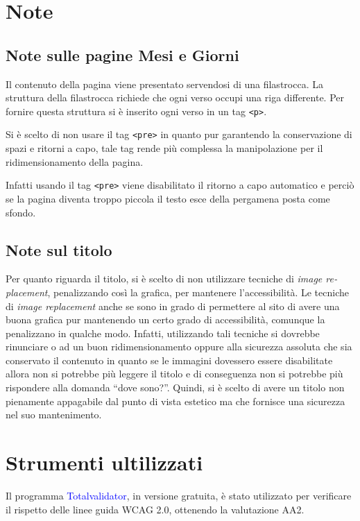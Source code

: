 \documentclass[10pt,a4paper,onecolumn]{article}
\newcommand{\inglese}[1]{\foreignlanguage{english}{\itshape{}#1}}
\newcommand{\progname}[1]{\textcolor{blue}{\textsf{#1}}}
\begin{document}
\section{Note}
\subsection{Note sulle pagine Mesi e Giorni}
Il contenuto della pagina viene presentato servendosi di una filastrocca. La struttura della filastrocca richiede che ogni verso occupi una riga differente. Per fornire questa struttura si è inserito ogni verso in un tag \texttt{<p>}.

Si è scelto di non usare il tag \texttt{<pre>} in quanto pur garantendo la conservazione di spazi e ritorni a capo, tale tag rende più complessa la manipolazione per il ridimensionamento della pagina.

Infatti usando il tag \texttt{<pre>} viene disabilitato il ritorno a capo automatico e perciò se la pagina diventa troppo piccola il testo esce della pergamena posta come sfondo.

\subsection{Note sul titolo}

Per quanto riguarda il titolo, si è scelto di non utilizzare tecniche di \inglese{image replacement}, penalizzando così la grafica, per mantenere l'accessibilità. Le tecniche di \inglese{image replacement} anche se sono in grado di permettere al sito di avere una buona grafica pur mantenendo un certo grado di accessibilità, comunque la penalizzano in qualche modo. Infatti, utilizzando tali tecniche si dovrebbe rinunciare o ad un buon ridimensionamento oppure alla sicurezza assoluta che sia conservato il contenuto in quanto se le immagini dovessero essere disabilitate allora non si potrebbe più leggere il titolo e di conseguenza non si potrebbe più rispondere alla domanda ``dove sono?''. Quindi, si è scelto di avere un titolo non pienamente appagabile dal punto di vista estetico ma che fornisce una sicurezza nel suo mantenimento.

\section{Strumenti ultilizzati}\label{sec:strumenti}

Il programma \progname{Totalvalidator}, in versione gratuita, è stato utilizzato per verificare il rispetto delle linee guida WCAG 2.0, ottenendo la valutazione AA2.
\end{document}
